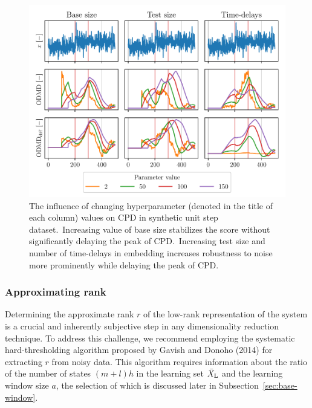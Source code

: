 \begin{figure}[H]
	\centering
	\includegraphics[width=\linewidth]{figures/Unit step-parameters-influence-ref_size_test_size_hn.pdf}
	\caption{The influence of changing hyperparameter (denoted in the title of each column) values on CPD in synthetic unit step dataset.~Increasing value of base size stabilizes the score without significantly delaying the peak of CPD.~Increasing test size and number of time-delays in embedding increases robustness to noise more prominently while delaying the peak of CPD.}\label{fig:hyperparameters}
\end{figure}

\subsubsection{Approximating rank}
Determining the approximate rank \( r \) of the low-rank representation of the system is a crucial and inherently subjective step in any dimensionality reduction technique. To address this challenge, we recommend employing the systematic hard-thresholding algorithm proposed by Gavish and Donoho (2014) for extracting \( r \) from noisy data. This algorithm requires information about the ratio of the number of states \((m + l) h\) in the learning set \(\bar{X} _{\text{L}}\) and the learning window size \(a\), the selection of which is discussed later in Subsection~\ref{sec:base-window}.

